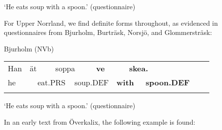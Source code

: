 \begin{styleTranslation}
‘He eats soup with a spoon.’ (questionnaire)

\end{styleTranslation}

\begin{styleBodyTextFirst}
For Upper Norrland, we find definite forms throughout, as evidenced in questionnaires from Bjurholm, Burträsk, Norsjö, and Glommersträsk:

\end{styleBodyTextFirst}

\begin{listWWNumileveli}
\item 

\begin{styleExample}
Bjurholm (NVb)

\end{styleExample}

\end{listWWNumileveli}

\begin{tabular}{llllllllllll}
\lsptoprule
Han & \multicolumn{2}{l}{ät

} & \multicolumn{2}{l}{soppa

} & \multicolumn{2}{l}{{\bfseries ve}

} & \multicolumn{2}{l}{{\bfseries skea.}

} & \multicolumn{2}{l}{} & \\
\multicolumn{2}{l}{he

} & \multicolumn{2}{l}{eat.PRS

} & \multicolumn{2}{l}{soup.DEF

} & \multicolumn{2}{l}{{\bfseries with}

} & \multicolumn{2}{l}{{\bfseries spoon.DEF}

} & \multicolumn{2}{l}{}\\
\lspbottomrule
\end{tabular}

\begin{styleTranslation}
‘He eats soup with a spoon.’ (questionnaire)

\end{styleTranslation}

\begin{styleBodyTextFirst}
In an early text from Överkalix, the following example is found:

\end{styleBodyTextFirst}

